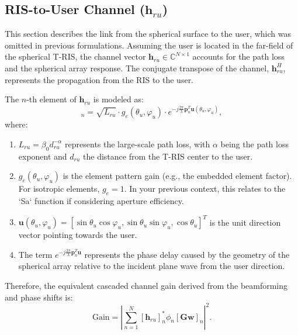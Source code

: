\documentclass[journal,comsoc]{IEEEtran}
\begin{document}
\subsection{RIS-to-User Channel ($\mathbf{h}_{ru}$)}
This section describes the link from the spherical surface to the user, which was omitted in previous formulations. Assuming the user is located in the far-field of the spherical T-RIS, the channel vector $\mathbf{h}_{ru} \in \mathbb{C}^{N \times 1}$ accounts for the path loss and the spherical array response. The conjugate transpose of the channel, $\mathbf{h}_{ru}^H$, represents the propagation from the RIS to the user.

The $n$-th element of $\mathbf{h}_{ru}$ is modeled as:
\begin{equation}
	[\mathbf{h}_{ru}]_n = \sqrt{L_{ru}} \cdot g_e(\theta_u, \varphi_u) \cdot e^{-j \frac{2\pi}{\lambda} \mathbf{p}_n^T \mathbf{u}(\theta_u, \varphi_u)},
\end{equation}
where:
\begin{enumerate}
	\item $L_{ru} = \beta_0 d_{ru}^{-\alpha}$ represents the large-scale path loss, with $\alpha$ being the path loss exponent and $d_{ru}$ the distance from the T-RIS center to the user.
	\item $g_e(\theta_u, \varphi_u)$ is the element pattern gain (e.g., the embedded element factor). For isotropic elements, $g_e=1$. In your previous context, this relates to the `Sa` function if considering aperture efficiency.
	\item $\mathbf{u}(\theta_u, \varphi_u) = [\sin\theta_u \cos\varphi_u, \sin\theta_u \sin\varphi_u, \cos\theta_u]^T$ is the unit direction vector pointing towards the user.
	\item The term $e^{-j \frac{2\pi}{\lambda} \mathbf{p}_n^T \mathbf{u}}$ represents the phase delay caused by the geometry of the spherical array relative to the incident plane wave from the user direction.
\end{enumerate}

Therefore, the equivalent cascaded channel gain derived from the beamforming and phase shifts is:
\begin{equation}
	\text{Gain} = \left| \sum_{n=1}^{N} [\mathbf{h}_{ru}]_n^* \phi_n [\mathbf{G}\mathbf{w}]_n \right|^2.
\end{equation}
\end{document}
